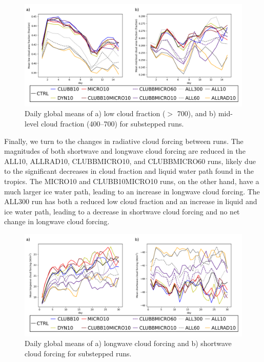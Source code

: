 \documentclass [11pt, proquest] {uwthesis}[2020/02/24]
\begin{document}
\begin{figure}
    \centering
    \includegraphics[width=5.5in]{Figure11.png}
    \caption{Daily global means of a) low cloud fraction ($>$ \SI{700}{\millibar}), and b) mid-level cloud fraction (\SIrange[range-phrase=--,range-units=single]{400}{700}{\millibar}) for substepped runs.}
    \label{fig:cldlow-cldmed}
\end{figure}

Finally, we turn to the changes in radiative cloud forcing between runs. The magnitudes of both shortwave and longwave cloud forcing are reduced in the ALL10, ALLRAD10, CLUBBMICRO10, and CLUBBMICRO60 runs, likely due to the significant decreases in cloud fraction and liquid water path found in the tropics. The MICRO10 and CLUBB10MICRO10 runs, on the other hand, have a much larger ice water path, leading to an increase in longwave cloud forcing. The ALL300 run has both a reduced low cloud fraction and an increase in liquid and ice water path, leading to a decrease in shortwave cloud forcing and no net change in longwave cloud forcing.

\begin{figure}
    \centering
    \includegraphics[width=5.5in]{Figure12.png}
    \caption{Daily global means of a) longwave cloud forcing and b) shortwave cloud forcing for substepped runs.}
    \label{fig:cld-frc}
\end{figure}
\end{document}
